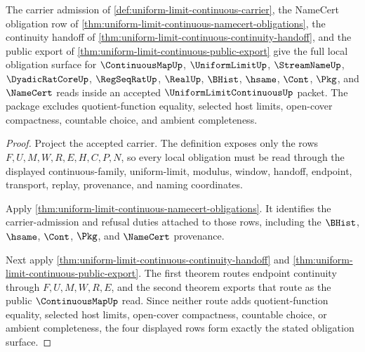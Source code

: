 \begin{theorem}
\label{thm:uniform-limit-continuous-obligation-closure-package}
The carrier admission of \autoref{def:uniform-limit-continuous-carrier}, the NameCert obligation row of \autoref{thm:uniform-limit-continuous-namecert-obligations}, the continuity handoff of \autoref{thm:uniform-limit-continuous-continuity-handoff}, and the public export of \autoref{thm:uniform-limit-continuous-public-export} give the full local obligation surface for $\ContinuousMapUp$, $\UniformLimitUp$, $\StreamNameUp$, $\DyadicRatCoreUp$, $\RegSeqRatUp$, $\RealUp$, $\BHist$, $\hsame$, $\Cont$, $\Pkg$, and $\NameCert$ reads inside an accepted $\UniformLimitContinuousUp$ packet. The package excludes quotient-function equality, selected host limits, open-cover compactness, countable choice, and ambient completeness.
\end{theorem}
\begin{proof}
Project the accepted carrier. The definition exposes only the rows $F,U,M,W,R,E,H,C,P,N$, so every local obligation must be read through the displayed continuous-family, uniform-limit, modulus, window, handoff, endpoint, transport, replay, provenance, and naming coordinates.

Apply \autoref{thm:uniform-limit-continuous-namecert-obligations}. It identifies the carrier-admission and refusal duties attached to those rows, including the $\BHist$, $\hsame$, $\Cont$, $\Pkg$, and $\NameCert$ provenance.

Next apply \autoref{thm:uniform-limit-continuous-continuity-handoff} and \autoref{thm:uniform-limit-continuous-public-export}. The first theorem routes endpoint continuity through $F,U,M,W,R,E$, and the second theorem exports that route as the public $\ContinuousMapUp$ read. Since neither route adds quotient-function equality, selected host limits, open-cover compactness, countable choice, or ambient completeness, the four displayed rows form exactly the stated obligation surface.
\end{proof}


